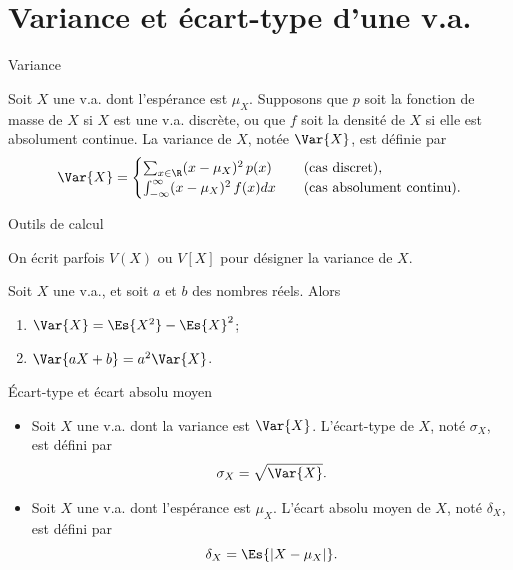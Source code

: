 \documentclass[nuit,charter,pied]{BeamerJS}
\begin{document}
\section[Var. et écart-type]{Variance et écart-type d'une v.a.}
\begin{frame}{Variance}
	\pause
	\begin{defn}{}
		Soit $X$ une v.a. dont l'espérance est $\mu_X$. Supposons que $p$ soit la fonction de masse de $X$ si $X$ est une v.a. discrète, ou que $f$ soit la densité de $X$ si elle est absolument continue. La variance de $X$, notée $\Var{X}$, est définie par
		\[\Var{X}=\begin{cases}
			\sum_{x\in\R}(x-\mu_X)^2\,p(x)&\quad \text{(cas discret),}\\
			\int_{-\infty}^{\infty}(x-\mu_X)^2\,f(x)dx&\quad \text{(cas absolument continu).}\end{cases}\]
	\end{defn}
\end{frame}
\begin{frame}{Outils de calcul}
	\begin{rem}
	On écrit parfois $V(X)$ ou $V[X]$ pour désigner la variance de $X$.
	\end{rem}
	\begin{thm}
		Soit $X$ une v.a., et soit $a$ et $b$ des nombres réels. Alors
		\begin{enumerate}
			\item \(\Var{X}=\Es{X^2}-\Es{X}^2\);\\
			\item \(\Var{aX+b}=a^2\Var{X}\).\\
		\end{enumerate}
	\end{thm}
\end{frame}
\begin{frame}{Écart-type et écart absolu moyen}
	\pause
	\begin{defns}
		\begin{itemize}
		\item Soit $X$ une v.a. dont la variance est \(\Var{X}\). L'écart-type de $X$, noté $\sigma_X$, est défini par
		\[\sigma_X=\sqrt{\Var{X}}.\]
		\item Soit $X$ une v.a. dont l'espérance est \(\mu_X\). L'écart absolu moyen de $X$, noté $\delta_X$, est défini par
		\[\delta_X=\Es{\left|X-\mu_X\right|}.\]
		\end{itemize}
	\end{defns}
\end{frame}
\end{document}
